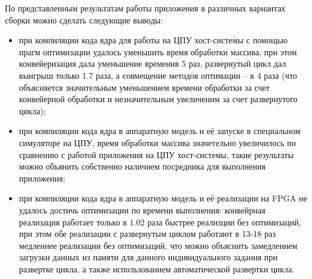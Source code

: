 По представленным результатам работы приложения в различных вариантах сборки
можно сделать следующие выводы:
\begin{itemize}
    \item при компиляции кода ядра для работы на ЦПУ хост-системы с помощью
          прагм оптимизации удалось уменьшить время обработки массива, при этом
          конвейеризация дала уменьшение временив 5 раз, развернутый цикл дал
          выигрыш только 1.7 раза, а совмещение методов оптимации -- в 4 раза
          (что объясняется значительным уменьшением времени обработки за счет
          конвейерной обработки и незначительным увеличеним за счет
          развернутого цикла);
    \item при компиляции кода ядра в аппаратную модель и её запуске в
          специальном симуляторе на ЦПУ, время обработки массива значетельно
          увеличилось по сравнению с работой приложения на ЦПУ хост-системы,
          такие результаты можно объянить собственно наличием посредника для
          выполнения приложения;
    \item при компиляции кода ядра в аппаратную модель и её реализации на FPGA
          не удалось достичь оптимизации по времени выполнения: конвейрная
          реализация работает только в 1.02 раза быстрее реализции без
          оптимизаций, при этом обе реализации с развернутым циклом работают в
          13-18 раз медленнее реализации без оптимизаций, что можно объяснить
          замедлением загрузки данных из памяти для данного индивидуального
          задания при развертке цикла, а также использованием автоматической
          развертки цикла.
\end{itemize}
